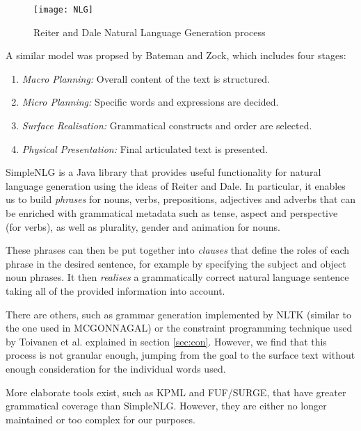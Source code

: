 \begin{figure}[h!]
\centering
\texttt{[image: NLG]}
\caption{Reiter and Dale Natural Language Generation process}
\label{fig:nlg}
\end{figure}

A similar model was propsed by Bateman and Zock\cite{mitkov2003oxford}, which includes four stages:
\begin{enumerate}
\item{\textit{Macro Planning:} Overall content of the text is structured.}
\item{\textit{Micro Planning:} Specific words and expressions are decided.}
\item{\textit{Surface Realisation:} Grammatical constructs and order are selected.}
\item{\textit{Physical Presentation:} Final articulated text is presented.}
\end{enumerate}

SimpleNLG\cite{gatt2009simplenlg} is a Java library that provides useful functionality for natural language generation using the ideas of Reiter and Dale. In particular, it enables us to build \textit{phrases} for nouns, verbs, prepositions, adjectives and adverbs that can be enriched with grammatical metadata such as tense, aspect and perspective (for verbs), as well as plurality, gender and animation for nouns.

These phrases can then be put together into \textit{clauses} that define the roles of each phrase in the desired sentence, for example by specifying the subject and object noun phrases. It then \textit{realises} a grammatically correct natural language sentence taking all of the provided information into account.

There are others, such as grammar generation implemented by NLTK (similar to the one used in MCGONNAGAL) or the constraint programming technique used by Toivanen et al. explained in section \ref{sec:con}. However, we find that this process is not granular enough, jumping from the goal to the surface text without enough consideration for the individual words used.

More elaborate tools exist, such as KPML\cite{bateman1997enabling} and FUF\cite{elhadad1989fuf}/SURGE\cite{elhadad1996overview}, that have greater grammatical coverage than SimpleNLG. However, they are either no longer maintained or too complex for our purposes.




